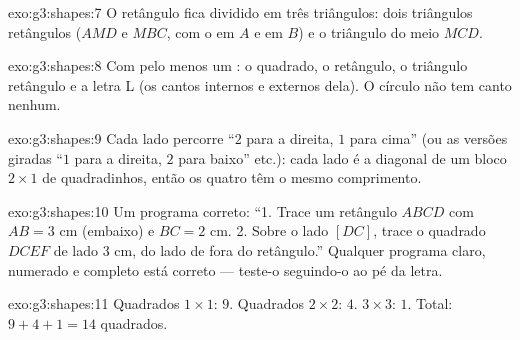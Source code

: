 \begin{solution}{exo:g3:shapes:7}
O retângulo fica dividido em três triângulos: dois triângulos
retângulos ($AMD$ e $MBC$, com o  em $A$ e em $B$) e o
triângulo do meio $MCD$.
\end{solution}

\begin{solution}{exo:g3:shapes:8}
Com pelo menos um : o quadrado, o retângulo, o triângulo
retângulo e a letra L (os cantos internos e externos dela). O
círculo não tem canto nenhum.
\end{solution}

\begin{solution}{exo:g3:shapes:9}
Cada lado percorre ``$2$ para a direita, $1$ para cima'' (ou as
versões giradas ``$1$ para a direita, $2$ para baixo'' etc.): cada
lado é a diagonal de um bloco $2 \times 1$ de quadradinhos, então os
quatro têm o mesmo comprimento.
\end{solution}

\begin{solution}{exo:g3:shapes:10}
Um programa correto: ``1. Trace um retângulo $ABCD$ com $AB = 3$ cm
(embaixo) e $BC = 2$ cm. 2. Sobre o lado $[DC]$, trace o quadrado
$DCEF$ de lado $3$ cm, do lado de fora do retângulo.'' Qualquer
programa claro, numerado e completo está correto --- teste-o
seguindo-o ao pé da letra.
\end{solution}

\begin{solution}{exo:g3:shapes:11}
Quadrados $1 \times 1$: $9$. Quadrados $2 \times 2$: $4$.
$3 \times 3$: $1$. Total: $9 + 4 + 1 = 14$ quadrados.
\end{solution}
